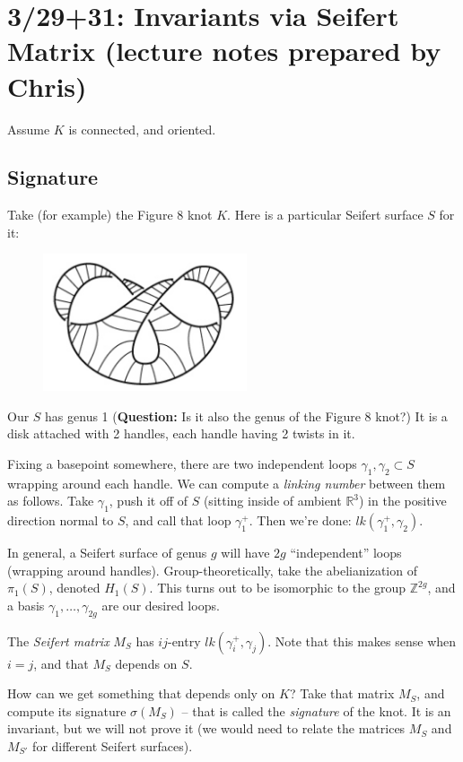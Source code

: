 \documentclass[11pt]{article}
\newcommand{\Z}{\mathbb{Z}}
\newcommand{\R}{\mathbb{R}}
\theoremstyle{plain}
\theoremstyle{definition}
\begin{document}
\clearpage
\section{3/29+31: Invariants via Seifert Matrix (lecture notes prepared by Chris)}

Assume $K$ is connected, and oriented.

\subsection{Signature}

Take (for example) the Figure 8 knot $K$. Here is a particular Seifert surface $S$ for it:

\begin{figure}[h]
  \centering
  \includegraphics[width=6cm]{Seifert.png}
\end{figure}

Our $S$ has genus 1 (\textbf{Question:} Is it also the genus of the Figure 8 knot?) It is a disk attached with 2 handles, each handle having 2 twists in it.

Fixing a basepoint somewhere, there are two independent loops $\gamma_1,\gamma_2\subset S$ wrapping around each handle. We can compute a \textit{linking number} between them as follows. Take $\gamma_1$, push it off of $S$ (sitting inside of ambient $\R^3$) in the positive direction normal to $S$, and call that loop $\gamma_1^+$. Then we're done: $lk(\gamma_1^+,\gamma_2)$.

\bigskip
In general, a Seifert surface of genus $g$ will have $2g$ ``independent'' loops (wrapping around handles). Group-theoretically, take the abelianization of $\pi_1(S)$, denoted $H_1(S)$. This turns out to be isomorphic to the group $\Z^{2g}$, and a basis $\gamma_1,\ldots,\gamma_{2g}$ are our desired loops.

\bigskip
The \textit{Seifert matrix} $M_S$ has $ij$-entry $lk(\gamma_i^+,\gamma_j)$. Note that this makes sense when $i=j$, and that $M_S$ depends on $S$.

\bigskip
How can we get something that depends only on $K$? Take that matrix $M_S$, and compute its signature $\sigma(M_S)$ -- that is called the \textit{signature} of the knot. It is an invariant, but we will not prove it (we would need to relate the matrices $M_S$ and $M_{S'}$ for different Seifert surfaces).
\end{document}
